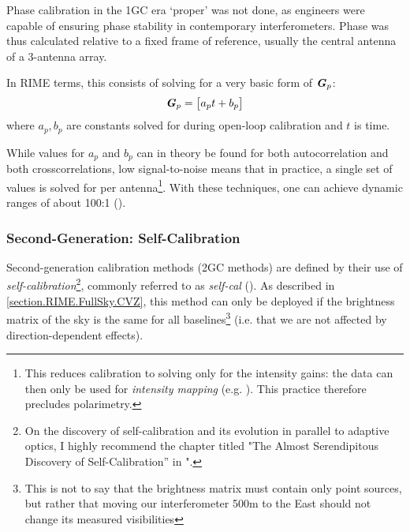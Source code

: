 \pg
Phase calibration in the 1GC era `proper' was not done, as engineers were capable of ensuring phase stability in contemporary interferometers. Phase was thus calculated relative to a fixed frame of reference, usually the central antenna of a 3-antenna array. 

\pg
In RIME terms, this consists of solving for a very basic form of $\textbf{\emph{G}}_p$:
\begin{equation}
\Gjones_p = \begin{bmatrix} a_p t + b_p \end{bmatrix} %
\end{equation}
where $a_p,b_p$ are constants solved for during open-loop calibration and $t$ is time. %

\pg
While values for $a_p$ and $b_p$ can in theory be found for both autocorrelation and both crosscorrelations, low signal-to-noise means that in practice, a single set of values is solved for per antenna\footnote{This reduces calibration to solving only for the intensity gains: the data can then only be used for \emph{intensity mapping} (e.g. ). This practice therefore precludes polarimetry.}. With these techniques, one can achieve dynamic ranges of about 100:1 ().

\subsubsection{Second-Generation: Self-Calibration}\label{section.calibration.2gc}

\pg
Second-generation calibration methods (2GC methods) are defined by their use of \emph{self-calibration}\footnote{On the discovery of self-calibration and its evolution in parallel to adaptive optics, I highly recommend the chapter titled "The Almost Serendipitous Discovery of Self-Calibration'' in "\href{http://library.nrao.edu/public/collection/02000000000280.pdf}{\citep{serendipitous}}.}, commonly referred to as \emph{self-cal} (). As described in \cref{section.RIME.FullSky.CVZ}, this method can only be deployed if the brightness matrix of the sky is the same for all baselines\footnote{This is not to say that the brightness matrix must contain only point sources, but rather that moving our interferometer 500m to the East should not change its measured visibilities} (i.e. that we are not affected by direction-dependent effects).

